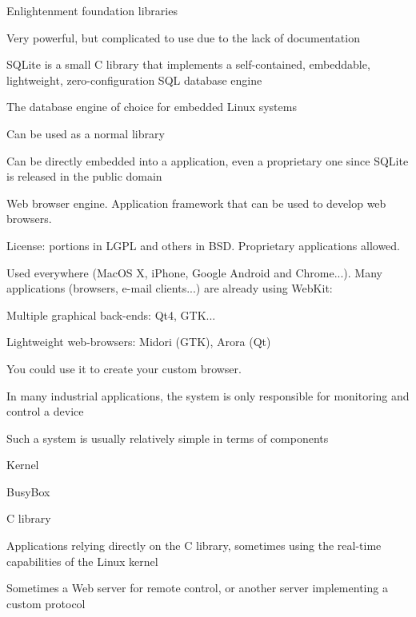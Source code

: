   \startitemize
  \item Enlightenment foundation libraries
    \startitemize
    \item Very powerful, but complicated to use due to the lack of
      documentation
    \item {}
    \stopitemize
  \stopitemize



  \startitemize
  \item SQLite is a small C library that implements a self-contained,
    embeddable, lightweight, zero-configuration SQL database engine
  \item The database engine of choice for embedded Linux systems
    \startitemize
    \item Can be used as a normal library
    \item Can be directly embedded into a application, even a
      proprietary one since SQLite is released in the public domain
    \stopitemize
  \stopitemize


    \startitemize
    \item Web browser engine. Application framework that can be used
      to develop web browsers.
    \item License: portions in LGPL and others in BSD. Proprietary
      applications allowed.
    \item Used everywhere (MacOS X, iPhone, Google Android and
      Chrome...). Many applications (browsers, e-mail clients...) are
      already using WebKit:
    \item Multiple graphical back-ends: Qt4, GTK...
    \item Lightweight web-browsers: Midori (GTK), Arora (Qt)
    \item You could use it to create your custom browser.
    \stopitemize

  \startitemize
  \item In many industrial applications, the system is only
    responsible for monitoring and control a device
  \item Such a system is usually relatively simple in terms of
    components
    \startitemize
    \item Kernel
    \item BusyBox
    \item C library
    \item Applications relying directly on the C library, sometimes
      using the real-time capabilities of the Linux kernel
    \item Sometimes a Web server for remote control, or another server
      implementing a custom protocol
    \stopitemize
  \stopitemize

